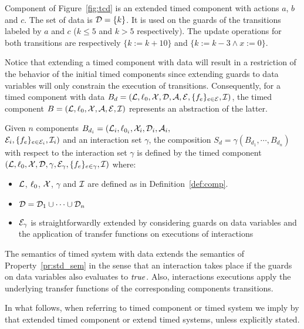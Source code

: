 
\begin{example}
  Component of Figure~\ref{fig:tcd} is an extended timed component with actions $a$, $b$ and $c$.
  The set of data is $\mathcal{D}=\{k\}$. It is used on the guards of the transitions labeled by
  $a$ and $c$ ($k\le 5$ and $k>5$ respectively). The update operations for both transitions
  are respectively $\{k:=k+10\}$ and $\{k:=k-3\wedge x:=0\}$.
\end{example}
\begin{remark}
  Notice that extending a timed component with data will result in a restriction
  of the behavior of the initial timed components since extending guards to data
  variables will only constrain the execution of transitions. Consequently,
  for a timed component with data $B_d=(\mathcal{L},\ell_0,\mathcal{X},\mathcal{D},\mathcal{A},\mathcal{E},\{f_e\}_{e\in\mathcal{E}},\mathcal{I})$, 
  the timed component $B=(\mathcal{L},\ell_0,\mathcal{X},\mathcal{A},\mathcal{E},\mathcal{I})$ represents an abstraction of the latter. 
\end{remark}

\begin{definition}\label{def:tce_sem}
  Given $n$ components $B_{d_i}=(\mathcal{L}_i,\ell_{0_i},\mathcal{X}_i,\mathcal{D}_i,\mathcal{A}_i,$\\$
  \mathcal{E}_i,\{f_e\}_{e\in\mathcal{E}_i},\mathcal{I}_i)$ and an interaction set $\gamma$,
  the composition $S_d=\gamma(B_{d_1},\cdots,B_{d_n})$ with respect to 
  the interaction set $\gamma$ is defined by the timed component 
  $(\mathcal{L},\ell_0,\mathcal{X},\mathcal{D},\gamma,\mathcal{E}_{\gamma},\{f_e\}_{e\in\gamma},\mathcal{I})$ where:
  \begin{itemize}
    \item $\mathcal{L}$, $\ell_0$, $\mathcal{X}$, $\gamma$ and $\mathcal{I}$ are defined as
      in Definition~\ref{def:comp}.
    \item $\mathcal{D}=\mathcal{D}_1\cup\cdots\cup\mathcal{D}_n$
    \item $\mathcal{E}_{\gamma}$ is straightforwardly extended by considering guards
      on data variables and the application of transfer functions on executions of interactions
  \end{itemize}
\end{definition}
The semantics of timed system with data extends the semantics of Property~\ref{pr:std_sem}
in the sense that an interaction takes place if the guards on data variables also evaluates
to $\textnormal{\textit{true}}$. Also, interactions executions apply the underlying transfer functions of the
corresponding components transitions.

In what follows, when referring to timed component or timed system we imply by that 
extended timed component or extend timed systems, unless explicitly stated. 

